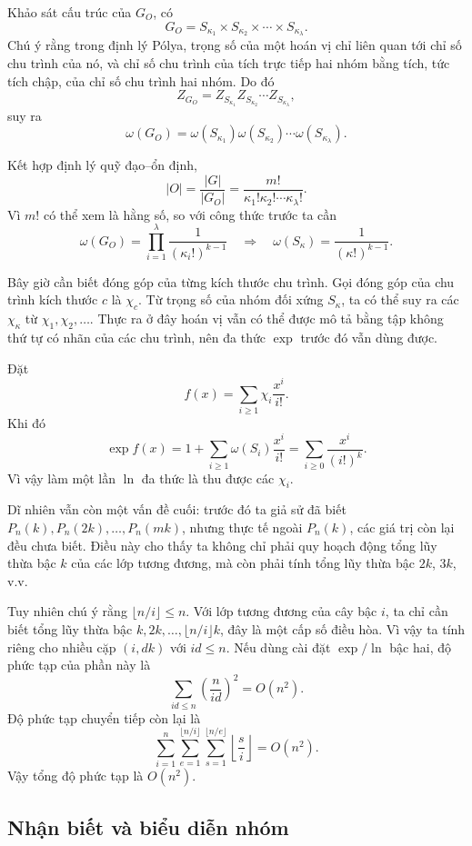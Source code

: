 \documentclass[11pt]{article}
\begin{document}
Khảo sát cấu trúc của \(G_O\), có
\[
  G_O=S_{\kappa_1}\times S_{\kappa_2}\times\cdots\times S_{\kappa_\lambda}.
\]
Chú ý rằng trong định lý Pólya, trọng số của một hoán vị chỉ liên quan tới chỉ
số chu trình của nó, và chỉ số chu trình của tích trực tiếp hai nhóm bằng tích,
tức tích chập, của chỉ số chu trình hai nhóm. Do đó
\[
  Z_{G_O}=Z_{S_{\kappa_1}}Z_{S_{\kappa_2}}\cdots Z_{S_{\kappa_\lambda}},
\]
suy ra
\[
  \omega(G_O)=\omega(S_{\kappa_1})\omega(S_{\kappa_2})\cdots
  \omega(S_{\kappa_\lambda}).
\]

Kết hợp định lý quỹ đạo--ổn định,
\[
  |O|=\frac{|G|}{|G_O|}
  =\frac{m!}{\kappa_1!\kappa_2!\cdots\kappa_\lambda!}.
\]
Vì \(m!\) có thể xem là hằng số, so với công thức trước ta cần
\[
  \omega(G_O)=
  \prod_{i=1}^{\lambda}\frac{1}{(\kappa_i!)^{k-1}}
  \quad\Rightarrow\quad
  \omega(S_\kappa)=\frac{1}{(\kappa!)^{k-1}}.
\]

Bây giờ cần biết đóng góp của từng kích thước chu trình. Gọi đóng góp của chu
trình kích thước \(c\) là \(\chi_c\). Từ trọng số của nhóm đối xứng
\(S_\kappa\), ta có thể suy ra các \(\chi_\kappa\) từ
\(\chi_1,\chi_2,\ldots\). Thực ra ở đây hoán vị vẫn có thể được mô tả bằng tập
không thứ tự có nhãn của các chu trình, nên đa thức \(\exp\) trước đó vẫn dùng
được.

Đặt
\[
  f(x)=\sum_{i\ge 1}\chi_i\frac{x^i}{i!}.
\]
Khi đó
\[
  \exp f(x)
  =
  1+\sum_{i\ge 1}\omega(S_i)\frac{x^i}{i!}
  =
  \sum_{i\ge 0}\frac{x^i}{(i!)^k}.
\]
Vì vậy làm một lần \(\ln\) đa thức là thu được các \(\chi_i\).

Dĩ nhiên vẫn còn một vấn đề cuối: trước đó ta giả sử đã biết
\(P_n(k),P_n(2k),\ldots,P_n(mk)\), nhưng thực tế ngoài \(P_n(k)\), các giá trị
còn lại đều chưa biết. Điều này cho thấy ta không chỉ phải quy hoạch động tổng
lũy thừa bậc \(k\) của các lớp tương đương, mà còn phải tính tổng lũy thừa bậc
\(2k\), \(3k\), v.v.

Tuy nhiên chú ý rằng \(\lfloor n/i\rfloor\le n\). Với lớp tương đương của cây
bậc \(i\), ta chỉ cần biết tổng lũy thừa bậc \(k,2k,\ldots,\lfloor n/i\rfloor k\),
đây là một cấp số điều hòa. Vì vậy ta tính riêng cho nhiều cặp \((i,dk)\) với
\(id\le n\). Nếu dùng cài đặt \(\exp/\ln\) bậc hai, độ phức tạp của phần này là
\[
  \sum_{id\le n}\left(\frac{n}{id}\right)^2=O(n^2).
\]
Độ phức tạp chuyển tiếp còn lại là
\[
  \sum_{i=1}^{n}\sum_{e=1}^{\lfloor n/i\rfloor}
  \sum_{s=1}^{\lfloor n/e\rfloor}\left\lfloor\frac{s}{i}\right\rfloor
  =O(n^2).
\]
Vậy tổng độ phức tạp là \(O(n^2)\).

\subsection{Nhận biết và biểu diễn nhóm}
\end{document}
